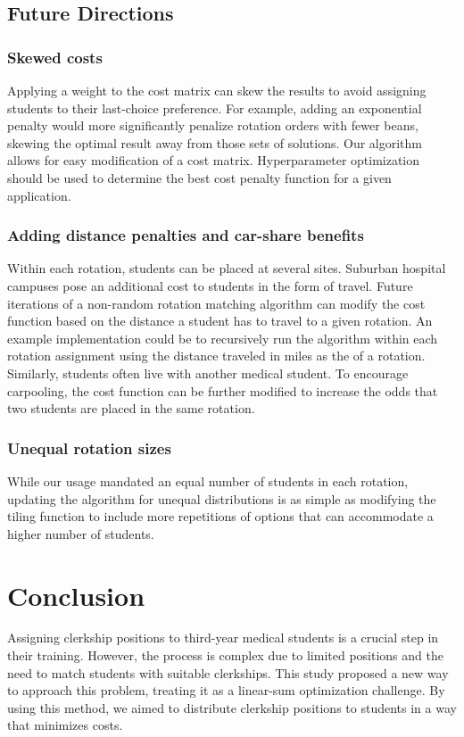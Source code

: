 \documentclass{article}
\begin{document}
\subsection{Future Directions}
\subsubsection{Skewed costs}
Applying a weight to the cost matrix can skew the results to avoid assigning students to their last-choice preference. For example, adding an exponential penalty would more significantly penalize rotation orders with fewer beans, skewing the optimal result away from those sets of solutions. Our algorithm allows for easy modification of a cost matrix. Hyperparameter optimization should be used to determine the best cost penalty function for a given application.

\subsubsection{Adding distance penalties and car-share benefits}
Within each rotation, students can be placed at several sites. Suburban hospital campuses pose an additional cost to students in the form of travel. Future iterations of a non-random rotation matching algorithm can modify the cost function based on the distance a student has to travel to a given rotation. An example implementation could be to recursively run the algorithm within each rotation assignment using the distance traveled in miles as the of a rotation. Similarly, students often live with another medical student. To encourage carpooling, the cost function can be further modified to increase the odds that two students are placed in the same rotation.

\subsubsection{Unequal rotation sizes}
While our usage mandated an equal number of students in each rotation, updating the algorithm for unequal distributions is as simple as modifying the tiling function to include more repetitions of options that can accommodate a higher number of students.

\section{Conclusion}
Assigning clerkship positions to third-year medical students is a crucial step in their training. However, the process is complex due to limited positions and the need to match students with suitable clerkships. This study proposed a new way to approach this problem, treating it as a linear-sum optimization challenge. By using this method, we aimed to distribute clerkship positions to students in a way that minimizes costs.
\end{document}
